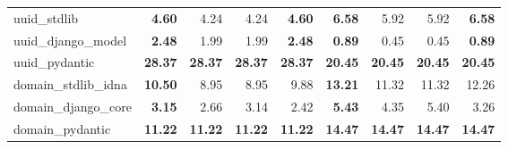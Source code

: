 \begin{table}[t]
\begin{tabular}{lrrrrrrrr}
uuid\_stdlib & \textbf{4.60} & 4.24 & 4.24 & \textbf{4.60} & \textbf{6.58} & 5.92 & 5.92 & \textbf{6.58} \\
uuid\_django\_model & \textbf{2.48} & 1.99 & 1.99 & \textbf{2.48} & \textbf{0.89} & 0.45 & 0.45 & \textbf{0.89} \\
uuid\_pydantic & \textbf{28.37} & \textbf{28.37} & \textbf{28.37} & \textbf{28.37} & \textbf{20.45} & \textbf{20.45} & \textbf{20.45} & \textbf{20.45} \\
domain\_stdlib\_idna & \textbf{10.50} & 8.95 & 8.95 & 9.88 & \textbf{13.21} & 11.32 & 11.32 & 12.26 \\
domain\_django\_core & \textbf{3.15} & 2.66 & 3.14 & 2.42 & \textbf{5.43} & 4.35 & 5.40 & 3.26 \\
domain\_pydantic & \textbf{11.22} & \textbf{11.22} & \textbf{11.22} & \textbf{11.22} & \textbf{14.47} & \textbf{14.47} & \textbf{14.47} & \textbf{14.47} \\
\bottomrule
\end{tabular}
\end{table}
